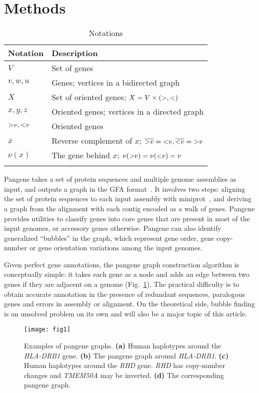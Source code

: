 \documentclass[webpdf,contemporary,large,namedate]{oup-authoring-template}%
\begin{document}
\section{Methods}

\begin{table}[!tb]
\caption{Notations\label{tab:sym}}
\begin{tabular*}{\columnwidth}{@{\extracolsep\fill}ll@{\extracolsep\fill}}
\toprule
Notation & Description \\
\midrule
$V$ & Set of genes \\
$v,w,u$ & Genes; vertices in a bidirected graph \\
$X$ & Set of oriented genes; $X=V\times({\rm >},{\rm <})$ \\
$x,y,z$ & Oriented genes; vertices in a directed graph \\
${\rm >}v,{\rm <}v$ & Oriented genes \\
$\overline{x}$ & Reverse complement of $x$; $\overline{{\rm >}v}={\rm <}v,\overline{{\rm <}v}={\rm >}v$ \\
$\nu(x)$ & The gene behind $x$; $\nu({\rm >}v)=\nu({\rm <}v)=v$ \\
\botrule
\end{tabular*}
\end{table}

Pangene takes a set of protein sequences and multiple genome assemblies as input,
and outputs a graph in the GFA format~\citep{Li:2020aa}.
It involves two steps: aligning the set of protein sequences to each input assembly with miniprot~\citep{Li:2023ac},
and deriving a graph from the alignment with each contig encoded as a walk of genes.
Pangene provides utilities to classify genes into core genes that are present in most of the input genomes, or accessory genes otherwise.
Pangene can also identify generalized ``bubbles'' in the graph, which represent gene order,
gene copy-number or gene orientation variations among the input genomes.

Given perfect gene annotations, the pangene graph construction algorithm is conceptually simple:
it takes each gene as a node and adds an edge between two genes if they are adjacent on a genome (Fig.~\ref{fig:ex1}).
The practical difficulty is to obtain accurate annotation in the presence of redundant sequences, paralogous genes and errors in assembly or alignment.
On the theoretical side, bubble finding is an unsolved problem on its own
and will also be a major topic of this article.

\begin{figure}[b!]
\centering
\texttt{[image: fig1]}
\caption{Examples of pangene graphs. {\bf (a)} Human haplotypes around the
\emph{HLA-DRB1} gene. {\bf (b)} The pangene graph around \emph{HLA-DRB1}. {\bf
(c)} Human haplotypes around the \emph{RHD} gene. \emph{RHD} has copy-number
changes and \emph{TMEM50A} may be inverted. {\bf (d)} The corresponding pangene
graph.}\label{fig:ex1}
\end{figure}
\end{document}
